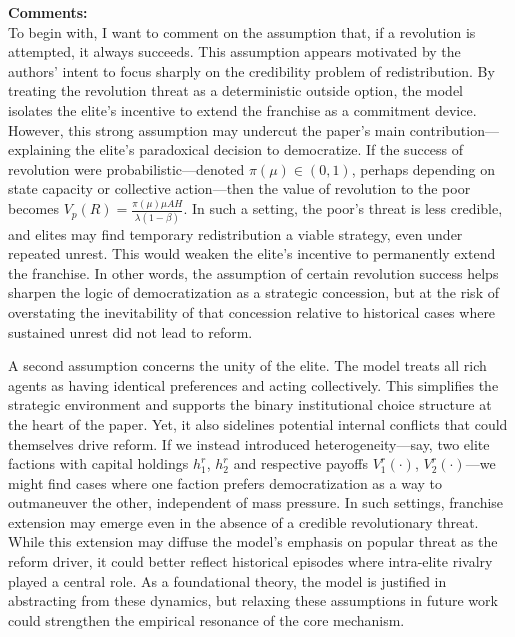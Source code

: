 \documentclass[10pt]{article}    %
\begin{document}
\vspace{1em}
\textbf{Comments:} \\
To begin with, I want to comment on the assumption that, if a revolution is attempted, it always succeeds. This assumption appears motivated by the authors’ intent to focus sharply on the credibility problem of redistribution. By treating the revolution threat as a deterministic outside option, the model isolates the elite’s incentive to extend the franchise as a commitment device. However, this strong assumption may undercut the paper’s main contribution—explaining the elite’s paradoxical decision to democratize. If the success of revolution were probabilistic—denoted \( \pi(\mu) \in (0,1) \), perhaps depending on state capacity or collective action—then the value of revolution to the poor becomes $V_p(R) = \frac{\pi(\mu) \mu A H}{\lambda (1 - \beta)}.$ In such a setting, the poor’s threat is less credible, and elites may find temporary redistribution a viable strategy, even under repeated unrest. This would weaken the elite’s incentive to permanently extend the franchise. In other words, the assumption of certain revolution success helps sharpen the logic of democratization as a strategic concession, but at the risk of overstating the inevitability of that concession relative to historical cases where sustained unrest did not lead to reform.

A second assumption concerns the unity of the elite. The model treats all rich agents as having identical preferences and acting collectively. This simplifies the strategic environment and supports the binary institutional choice structure at the heart of the paper. Yet, it also sidelines potential internal conflicts that could themselves drive reform. If we instead introduced heterogeneity—say, two elite factions with capital holdings \( h^r_1 \), \( h^r_2 \) and respective payoffs \( V^r_1(\cdot) \), \( V^r_2(\cdot) \)—we might find cases where one faction prefers democratization as a way to outmaneuver the other, independent of mass pressure. In such settings, franchise extension may emerge even in the absence of a credible revolutionary threat. While this extension may diffuse the model’s emphasis on popular threat as the reform driver, it could better reflect historical episodes where intra-elite rivalry played a central role. As a foundational theory, the model is justified in abstracting from these dynamics, but relaxing these assumptions in future work could strengthen the empirical resonance of the core mechanism.
\end{document}
